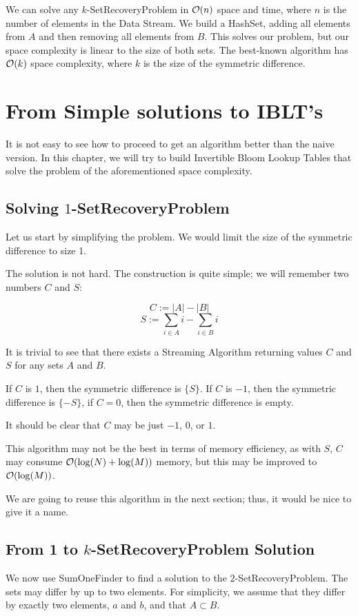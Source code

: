 We can solve any \(k\)-SetRecoveryProblem in \(\mathcal{O}(n)\) space and time, where \(n\) is the number of elements in the Data Stream. We build a HashSet, adding all elements from \(A\) and then removing all elements from \(B\). This solves our problem, but our space complexity is linear to the size of both sets. The best-known algorithm has \(\mathcal{O}(k)\) space complexity, where \(k\) is the size of the symmetric difference.

\section{From Simple solutions to IBLT's}

It is not easy to see how to proceed to get an algorithm better than the naive version. In this chapter, we will try to build Invertible Bloom Lookup Tables that solve the problem of the aforementioned space complexity. 

\subsection{Solving \(1\)-SetRecoveryProblem}

Let us  start by simplifying the problem. We would limit the size of the symmetric difference to size 1.

The solution is not hard.
The construction is quite simple; we will remember two numbers \(C\) and \(S\):

\[ C := |A| - |B| \]
\[ S := \sum_{i\in A} i - \sum_{i\in B} i \]

It is trivial to see that there exists a Streaming Algorithm returning values \(C\) and \(S\) for any sets \(A\) and \(B\).

If \(C\) is \(1\), then the symmetric difference is \(\{S\}\). If \(C\) is \(-1\), then the symmetric difference is \(\{-S\}\), if \(C = 0\), then the symmetric difference is empty.

It should be clear that \(C\) may be just \(-1\), \(0\), or \(1\).

This algorithm may not be the best in terms of memory efficiency, as with \(S\), \(C\) may consume \(\mathcal{O}(\log(N) + \log(M))\) memory, but this may be improved to \(\mathcal{O}(\log(M))\). 

We are going to reuse this algorithm in the next section; thus, it would be nice to give it a name.


\subsection{From 1 to $k$-SetRecoveryProblem Solution}
We now use SumOneFinder to find a solution to the $2$-SetRecoveryProblem. The sets may differ by up to two elements. For simplicity, we assume that they differ by exactly two elements, $a$ and $b$, and that $A \subset B$.

